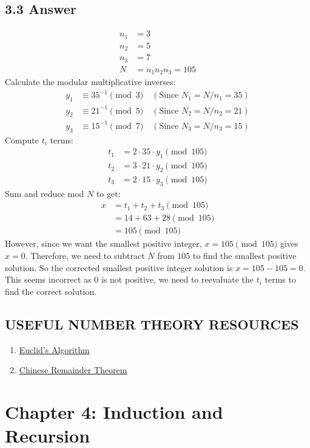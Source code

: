 \documentclass{article}
\begin{document}
\subsection*{3.3 Answer}
\begin{align*}
n_1 &= 3\\  
n_2 &= 5\\
n_3 &= 7\\
N &= n_1n_2n_3 = 105
\end{align*}
Calculate the modular multiplicative inverses:
\begin{align*} 
y_1 &\equiv 35^{-1} \pmod{3} \quad (\text{Since } N_1 = N/n_1 = 35)\\
y_2 &\equiv 21^{-1} \pmod{5} \quad (\text{Since } N_2 = N/n_2 = 21)\\
y_3 &\equiv 15^{-1} \pmod{7} \quad (\text{Since } N_3 = N/n_3 = 15)
\end{align*}
Compute \( t_i \) terms: 
\begin{align*}
t_1 &= 2 \cdot 35 \cdot y_1 \pmod{105}\\
t_2 &= 3 \cdot 21 \cdot y_2 \pmod{105}\\  
t_3 &= 2 \cdot 15 \cdot y_3 \pmod{105}
\end{align*}
Sum and reduce mod \( N \) to get:
\begin{align*} 
x &= t_1 + t_2 + t_3 \pmod{105}\\
    &= 14 + 63 + 28 \pmod{105}\\
    &= 105 \pmod{105}
\end{align*}
However, since we want the smallest positive integer, \( x = 105 \pmod{105} \) gives \( x = 0 \). Therefore, we need to subtract \( N \) from \( 105 \) to find the smallest positive solution. So the corrected smallest positive integer solution is \( x = 105 - 105 = 0 \). This seems incorrect as 0 is not positive, we need to reevaluate the \( t_i \) terms to find the correct solution.
\newpage
\subsection*{USEFUL NUMBER THEORY RESOURCES}
\begin{enumerate}
    \item \href{https://www.youtube.com/watch?v=yHwneN6zJmU}{Euclid's Algorithm}
    \item \href{https://www.youtube.com/watch?v=ru7mWZJlRQg&t=276s}{Chinese Remainder Theorem} 
\end{enumerate}
\newpage
\section*{Chapter 4: Induction and Recursion}
\end{document}
